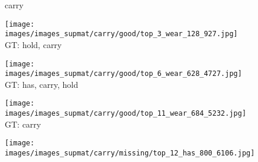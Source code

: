 \documentclass[10pt,twocolumn,letterpaper]{article}
\begin{document}
\begin{figure*}[t]
	\begin{minipage}[t]{0.005\textwidth}
    	\centering
    	\vspace{-9ex}
    	\begin{turn}{90}
    	carry
    	\end{turn}
    	\vspace{2ex}
    \end{minipage}
    \hspace{0.01\textwidth}
	\begin{minipage}[t]{0.18\textwidth}
    	\centering
       	\texttt{[image: images/images\_supmat/carry/good/top\_3\_wear\_128\_927.jpg]}\\
       	\vspace{0.3ex}
       	GT: hold, carry
       	\vspace{2ex}
    \end{minipage}
    \hspace{0.005\textwidth}
    \begin{minipage}[t]{0.18\textwidth}
    	\centering
       	\texttt{[image: images/images\_supmat/carry/good/top\_6\_wear\_628\_4727.jpg]}\\
       	\vspace{0.3ex}
       	GT: has, carry, hold
       	\vspace{0.2ex}
    \end{minipage}
    \hspace{0.005\textwidth}
	\begin{minipage}[t]{0.18\textwidth}
    	\centering
       	\texttt{[image: images/images\_supmat/carry/good/top\_11\_wear\_684\_5232.jpg]}\\
       	\vspace{0.3ex}
       	GT: carry
       	\vspace{0.2ex}
    \end{minipage}
    \hspace{0.005\textwidth}
    \begin{minipage}[t]{0.18\textwidth}
    	\centering
       	\texttt{[image: images/images\_supmat/carry/missing/top\_12\_has\_800\_6106.jpg]}\\

\end{minipage}
\end{figure*}
\end{document}
